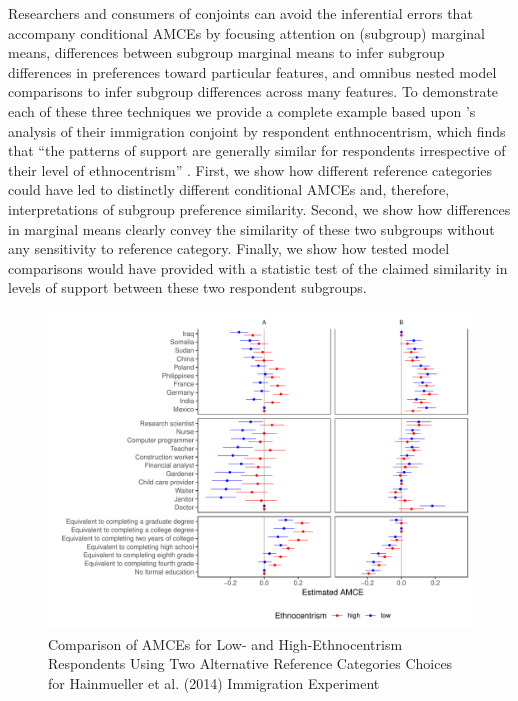\documentclass[a4paper,12pt]{article}\usepackage[]{graphicx}\usepackage[]{color}
\makeatletter
\def\maxwidth{ %
  \ifdim\Gin@nat@width>\linewidth
    \linewidth
  \else
    \Gin@nat@width
  \fi
}
\newenvironment{knitrout}{}{} %
\makeatother
\begin{document}
Researchers and consumers of conjoints can avoid the inferential errors that accompany conditional AMCEs by focusing attention on (subgroup) marginal means, differences between subgroup marginal means to infer subgroup differences in preferences toward particular features, and omnibus nested model comparisons to infer subgroup differences across many features. To demonstrate each of these three techniques we provide a complete example based upon \citeauthor{HainmuellerHopkinsYamamoto2014}'s analysis of their immigration conjoint by respondent enthnocentrism, which finds that ``the patterns of support are generally similar for respondents irrespective of their level of ethnocentrism'' \citep[22]{HainmuellerHopkinsYamamoto2014}. First, we show how different reference categories could have led to distinctly different conditional AMCEs and, therefore, interpretations of subgroup preference similarity. Second, we show how differences in marginal means clearly convey the similarity of these two subgroups without any sensitivity to reference category. Finally, we show how tested model comparisons would have provided \citeauthor{HainmuellerHopkinsYamamoto2014} with a statistic test of the claimed similarity in levels of support between these two respondent subgroups.





\begin{knitrout}
\color{fgcolor}\begin{figure}
\includegraphics[width=\maxwidth]{figure/hainmueller_subgroup_example_plot-1} \caption[Comparison of AMCEs for Low- and High-Ethnocentrism Respondents Using Two Alternative Reference Categories Choices for Hainmueller et al]{Comparison of AMCEs for Low- and High-Ethnocentrism Respondents Using Two Alternative Reference Categories Choices for Hainmueller et al. (2014) Immigration Experiment}\label{fig:hainmueller_subgroup_example_plot}
\end{figure}


\end{knitrout}
\end{document}
